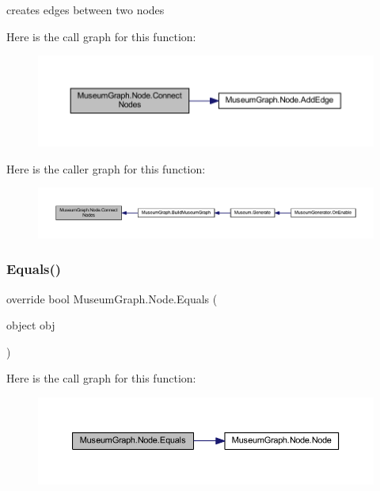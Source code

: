 creates edges between two nodes 

Here is the call graph for this function\+:
\nopagebreak
\begin{figure}[H]
\begin{center}
\leavevmode
\includegraphics[width=350pt]{class_museum_graph_1_1_node_afc85f1140ee37f6365863f34ac3482bc_cgraph}
\end{center}
\end{figure}
Here is the caller graph for this function\+:
\nopagebreak
\begin{figure}[H]
\begin{center}
\leavevmode
\includegraphics[width=350pt]{class_museum_graph_1_1_node_afc85f1140ee37f6365863f34ac3482bc_icgraph}
\end{center}
\end{figure}
\mbox{\label{class_museum_graph_1_1_node_a341a560512b816a8af059813480ef9da}} 
\subsubsection{\texorpdfstring{Equals()}{Equals()}}
{\footnotesize\ttfamily override bool Museum\+Graph.\+Node.\+Equals (\begin{DoxyParamCaption}\item[{object}]{obj }\end{DoxyParamCaption})}

Here is the call graph for this function\+:
\nopagebreak
\begin{figure}[H]
\begin{center}
\leavevmode
\includegraphics[width=350pt]{class_museum_graph_1_1_node_a341a560512b816a8af059813480ef9da_cgraph}
\end{center}
\end{figure}
\mbox{\label{class_museum_graph_1_1_node_adcc32750b64d61121c1431ffc41b0f8d}} 
